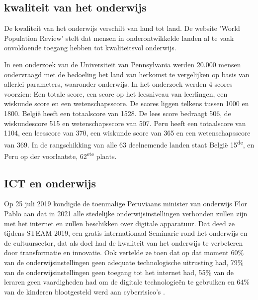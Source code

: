 \subsection{kwaliteit van het onderwijs}
De kwaliteit van het onderwijs verschilt van land tot land. \autocite{Review2020} De website 'World Population Review' stelt dat mensen in onderontwikkelde landen al te vaak onvoldoende toegang hebben tot kwaliteitsvol onderwijs. 

In een onderzoek van de Universiteit van Pennsylvania \autocite{UsNews2020} werden 20.000 mensen ondervraagd met de bedoeling het land van herkomst te vergelijken op basis van allerlei parameters, waaronder onderwijs. In het onderzoek werden 4 scores voorzien: Een totale score, een score op het leesniveau van leerlingen, een wiskunde score en een wetenschapsscore. De scores liggen telkens tussen 1000 en 1800. België heeft een totaalscore van 1528. De lees score bedraagt 506, de wiskundescore 515 en wetenschapsscore van 507. Peru heeft een totaalscore van 1104, een leesscore van 370, een wiskunde score van 365 en een wetenschapsscore van 369. In de rangschikking van alle 63 deelnemende landen staat België 15\textsuperscript{de}, en Peru op der voorlaatste, 62\textsuperscript{ste} plaats.




\subsection{ICT en onderwijs}
Op 25 juli 2019 kondigde de toenmalige Peruviaans minister van onderwijs Flor Pablo aan dat in 2021 alle stedelijke onderwijsinstellingen verbonden zullen zijn met het internet en zullen beschikken over digitale apparatuur. Dat deed ze tijdens STEAM 2019, een gratis internationaal Seminarie rond het onderwijs en de cultuursector, dat als doel had de kwaliteit van het onderwijs te verbeteren door transformatie en innovatie. Ook vertelde ze toen dat op dat moment 60\% van de onderwijsinstellingen geen adequate technologische uitrusting had, 79\% van de onderwijsinstellingen geen toegang tot het internet had, 55\% van de leraren geen vaardigheden had om de digitale technologieën te gebruiken en 64\% van de kinderen blootgesteld werd aan cyberrisico's \autocite{Educacion2019}.

